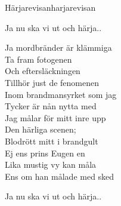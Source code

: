 \begin{song}{Härjarevisan}{harjarevisan}
\begin{vers}
Ja nu ska vi ut och härja..\\
\end{vers}
\begin{vers}
Ja mordbränder är klämmiga\\
Ta fram fotogenen\\
Och eftersläckningen\\
Tillhör just de fenomenen\\
Inom brandmansyrket som jag\\
Tycker är nån nytta med\\
Jag målar för mitt inre upp\\
Den härliga scenen;\\
Blodrött mitt i brandgult\\
Ej ens prins Eugen en\\
Lika mustig vy kan måla\\
Ens om han målade med sked\\
\end{vers}
\begin{vers}
Ja nu ska vi ut och härja..\\
\end{vers}
\end{song}
